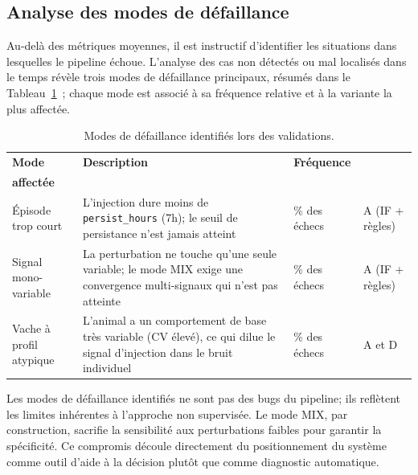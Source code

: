 \FloatBarrier
\subsection{Analyse des modes de défaillance}

Au-delà des métriques moyennes, il est instructif d'identifier les situations dans lesquelles
le pipeline échoue. L'analyse des cas non détectés ou mal localisés dans le temps révèle
trois modes de défaillance principaux, résumés dans le Tableau~\ref{tab:modes_defaillance}~;
chaque mode est associé à sa fréquence relative et à la variante la plus affectée.

\begin{table}[H]
    \centering
    \caption{Modes de défaillance identifiés lors des validations.}
    \label{tab:modes_defaillance}
    \small
    \begin{tabular}{>{\raggedright\arraybackslash}p{2.2cm}
                    >{\raggedright\arraybackslash}p{4.4cm}
                    >{\centering\arraybackslash}p{1.7cm}
                    >{\raggedright\arraybackslash}p{2.2cm}}
        \toprule
        \textbf{Mode} & \textbf{Description} & \textbf{Fréquence}
        & \shortstack[l]{\textbf{Variante}\\\textbf{affectée}} \\
        \midrule
        Épisode trop court
        & L'injection dure moins de \texttt{persist\_hours} (7h); le seuil de persistance
        n'est jamais atteint
        & 35\% des échecs & A (IF + règles) \\
        \addlinespace
        Signal mono-variable
        & La perturbation ne touche qu'une seule variable; le mode MIX exige une convergence
        multi-signaux qui n'est pas atteinte
        & 40\% des échecs & A (IF + règles) \\
        \addlinespace
        Vache à profil atypique
        & L'animal a un comportement de base très variable (CV élevé), ce qui dilue le signal
        d'injection dans le bruit individuel
        & 25\% des échecs & A et D \\
        \bottomrule
    \end{tabular}
\end{table}

Les modes de défaillance identifiés ne sont pas des bugs du pipeline; ils reflètent les limites
inhérentes à l'approche non supervisée. Le mode MIX, par construction, sacrifie la
sensibilité aux perturbations faibles pour garantir la spécificité. Ce compromis découle directement du positionnement du système comme outil d'aide à la
décision plutôt que comme diagnostic automatique.

